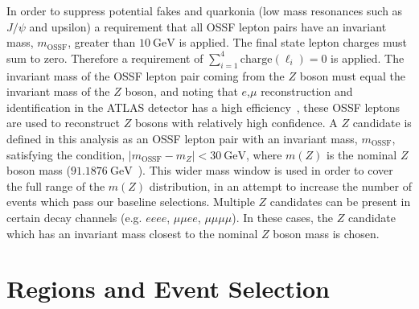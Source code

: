 In order to suppress potential fakes and quarkonia (low mass resonances such as $J/\psi$ and upsilon) a requirement that all OSSF lepton pairs have an invariant mass, $m_{\text{OSSF}}$, greater than $\SI{10}{\GeV}$ is applied. The final state lepton charges must sum to zero. Therefore a requirement of $\sum_{i=1}^{4} \text{charge}(\ell_i) = 0$ is applied. The invariant mass of the OSSF lepton pair coming from the $Z$ boson must equal the invariant mass of the $Z$ boson, and noting that $e$,$\mu$ reconstruction and identification in the ATLAS detector has a high efficiency~\cite{Marchese:2688452}, these OSSF leptons are used to reconstruct $Z$ bosons with relatively high confidence. A $Z$ candidate is defined in this analysis as an OSSF lepton pair with an invariant mass, $m_{\text{OSSF}}$, satisfying the condition, $|m_{\text{OSSF}} - m_Z| <  \SI{30}{\GeV}$, where $m(Z)$ is the nominal $Z$ boson mass ($\SI{91.1876}{\GeV}$~\cite{pdg}). This wider mass window is used in order to cover the full range of the $m(Z)$ distribution, in an attempt to increase the number of events which pass our baseline selections. Multiple $Z$ candidates can be present in certain decay channels (e.g. $eeee$, $\mu\mu ee$, $\mu \mu \mu \mu$). In these cases, the $Z$ candidate which has an invariant mass closest to the nominal $Z$ boson mass is chosen. 


\section{Regions and Event Selection}
\label{sec:regionsAndEventSelection}

